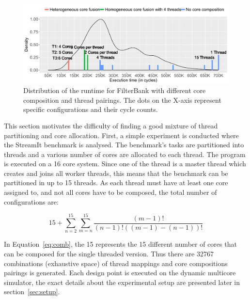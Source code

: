 
\begin{figure}[t]
    \centering
    \includegraphics[width=1\textwidth]{streamit-paper/graphics/filterbank_motivation_2.pdf}
    \caption{Distribution of the runtime for FilterBank with different core composition and thread pairings. The dots on the X-axis represent specific configurations and their cycle counts.}
     \label{fig:threadcoremotiv}
\end{figure}

This section motivates the difficulty of finding a good mixture of thread partitioning and core allocation.
First, a simple experiment is conducted where the  StreamIt benchmark is analysed.
The benchmark's tasks are partitioned into threads and a various number of cores are allocated to each thread.
The program is executed on a 16 core system.
Since one of the thread is a master thread which creates and joins all worker threads, this means that the benchmark can be partitioned in up to 15 threads.
As each thread must have at least one core assigned to, and not all cores have to be composed, the total number of configurations are:

\begin{equation}
15 + \sum_{n=2}^{15} \sum_{m=n}^{15} \frac{(m-1)!}{(n-1)!((m-1)-(n-1))!}
\label{eq:comb}
\end{equation}

In Equation~\ref{eq:comb}, the 15 represents the 15 different number of cores that can be composed for the single threaded version.
Thus there are 32767 combinations (exhaustive space) of thread mappings and core compositions pairings is generated.
Each design point is executed on the dynamic multicore simulator, the exact details about the experimental setup are presented later in section~\ref{sec:setup}.


